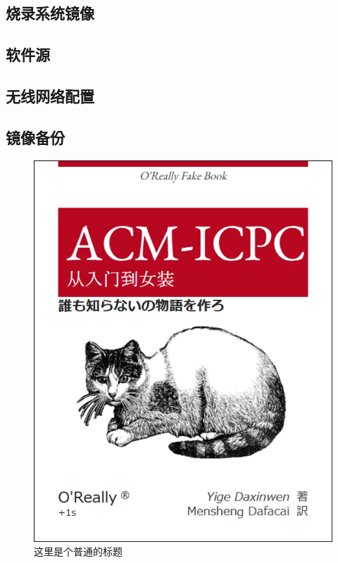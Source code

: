 		\subsection{烧录系统镜像}
		\subsection{软件源}
		\subsection{无线网络配置}
		\subsection{镜像备份}
\begin{figure}[ht]
	\centering
	\includegraphics[scale=0.6]{figures/figure1.png}
	\caption{
		这里是个普通的标题
	}
	\label{fig:example}
\end{figure}

